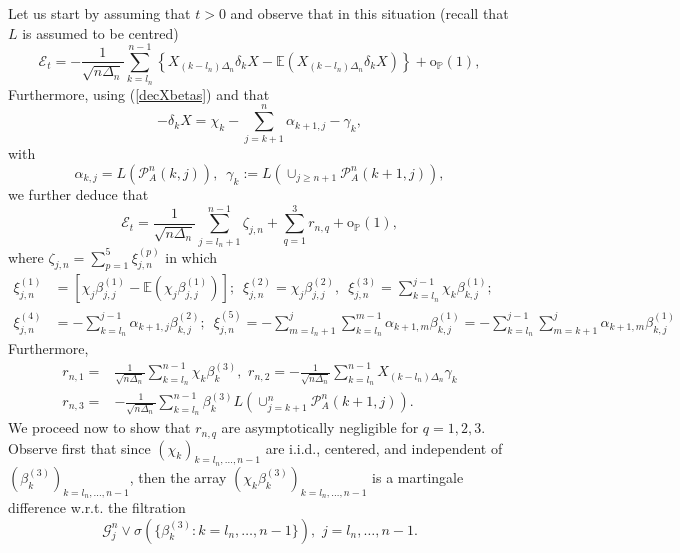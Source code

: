 \documentclass[10pt,a4paper]{amsart}
\begin{document}
	Let us start by assuming that $t>0$ and observe that in this situation
	(recall that $L$ is assumed to be centred) 
	\[
	\mathcal{E}_{t}=-\frac{1}{\sqrt{n\Delta_{n}}}\sum_{k=l_{n}}^{n-1}\left\{ X_{(k-l_{n})\Delta_{n}}\delta_{k}X-\mathbb{E}\left(X_{(k-l_{n})\Delta_{n}}\delta_{k}X\right)\right\} +\mathrm{o}_{\mathbb{P}}(1),
	\]
	Furthermore, using (\ref{decXbetas}) and that
	\begin{equation}
		-\delta_{k}X=  \chi_{k}-\sum_{j=k+1}^{n}\alpha_{k+1,j}-\gamma_{k},\label{incremrel}
	\end{equation}
	with
	\begin{equation}
		\alpha_{k,j}=L(\mathcal{P}_{A}^{n}(k,j)),\,\,\,\gamma_{k}:=L(\cup_{j\geq n+1}\mathcal{P}_{A}^{n}(k+1,j)),\label{defalpha}
	\end{equation}
	we further deduce that 
	\begin{equation}
		\mathcal{E}_{t}=\frac{1}{\sqrt{n\Delta_{n}}}\sum_{j=l_{n}+1}^{n-1}\zeta_{j,n}+\sum_{q=1}^{3}r_{n,q}+\mathrm{o}_{\mathbb{P}}(1),\label{errorrepmtg0}
	\end{equation}
	where $\zeta_{j,n}=\sum_{p=1}^{5}\xi_{j,n}^{(p)}$ in which 
	\begin{equation}
		\begin{aligned}\xi_{j,n}^{(1)} & =\left[\chi_{j}\beta_{j,j}^{(1)}-\mathbb{E}(\chi_{j}\beta_{j,j}^{(1)})\right];\,\,\,\xi_{j,n}^{(2)}=\chi_{j}\beta_{j,j}^{(2)},\,\,\,\xi_{j,n}^{(3)}=\sum_{k=l_{n}}^{j-1}\chi_{k}\beta_{k,j}^{(1)};\\
			\xi_{j,n}^{(4)} & =-\sum_{k=l_{n}}^{j-1}\alpha_{k+1,j}\beta_{k,j}^{(2)};\,\,\,\xi_{j,n}^{(5)}=-\sum_{m=l_{n}+1}^{j}\sum_{k=l_{n}}^{m-1}\alpha_{k+1,m}\beta_{k,j}^{(1)}=-\sum_{k=l_{n}}^{j-1}\sum_{m=k+1}^{j}\alpha_{k+1,m}\beta_{k,j}^{(1)}
		\end{aligned}
		\label{errorstpos}
	\end{equation}
	Furthermore, 
\begin{equation}\label{residuals_def}
\begin{aligned}r_{n,1}= & \frac{1}{\sqrt{n\Delta_{n}}}\sum_{k=l_{n}}^{n-1}\chi_{k}\beta_{k}^{(3)},\,\,r_{n,2}=-\frac{1}{\sqrt{n\Delta_{n}}}\sum_{k=l_{n}}^{n-1}X_{(k-l_{n})\Delta_{n}}\gamma_{k}\\
r_{n,3}= & -\frac{1}{\sqrt{n\Delta_{n}}}\sum_{k=l_{n}}^{n-1}\beta_{k}^{(3)}L(\cup_{j=k+1}^{n}\mathcal{P}_{A}^{n}(k+1,j)).
\end{aligned}
\end{equation}    
	We proceed now to show that $r_{n,q}$ are asymptotically negligible
	for $q=1,2,3$. Observe first that since $(\chi_{k})_{k=l_{n},\ldots,n-1}$
	are i.i.d., centered, and independent of $(\beta_{k}^{(3)})_{k=l_{n},\ldots,n-1}$,
	then the array $(\chi_{k}\beta_{k}^{(3)})_{k=l_{n},\ldots,n-1}$ is
	a martingale difference w.r.t. the filtration 
	\[
	\mathscr{G}_{j}^{n}\lor\sigma(\{\beta_{k}^{(3)}:k=l_{n},\ldots,n-1\}),\,\,j=l_{n},\ldots,n-1.
	\]
\end{document}
